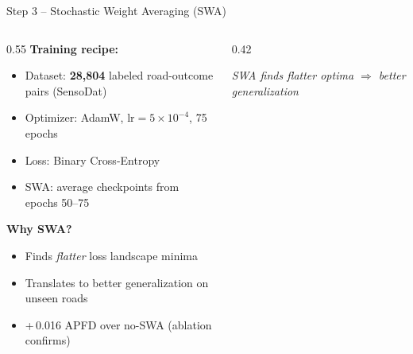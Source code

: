 \documentclass[aspectratio=169,10pt]{beamer}
\begin{document}
\begin{frame}{Step 3 -- Stochastic Weight Averaging (SWA)}
  \begin{columns}[T]
    \begin{column}{0.55\linewidth}
      \textbf{Training recipe:}
      \begin{itemize}
        \item Dataset: \textbf{28,804} labeled road-outcome pairs (SensoDat)
        \item Optimizer: AdamW, lr$=5{\times}10^{-4}$, 75 epochs
        \item Loss: Binary Cross-Entropy
        \item SWA: average checkpoints from epochs 50--75
      \end{itemize}
      \vspace{8pt}
      \textbf{Why SWA?}
      \begin{itemize}
        \item Finds \emph{flatter} loss landscape minima
        \item Translates to better generalization on unseen roads
        \item +\,0.016 APFD over no-SWA (ablation confirms)
      \end{itemize}
    \end{column}
    \begin{column}{0.42\linewidth}
      \begin{center}
      \end{center}
      \vspace{-4pt}
      {\small\itshape SWA finds flatter optima $\Rightarrow$ better generalization}
    \end{column}
  \end{columns}
\end{frame}
\end{document}
